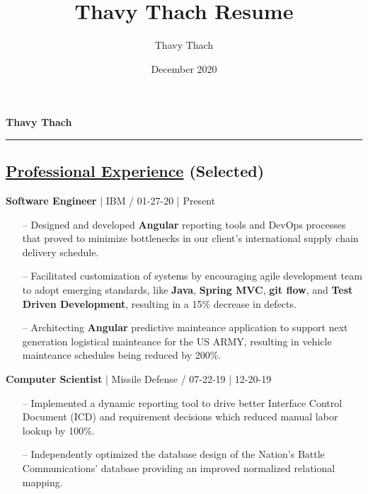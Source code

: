 \documentclass{article}
\title{Thavy Thach Resume}
\author{Thavy Thach}
\date{December 2020}
\begin{document}
\textbf{{\huge Thavy Thach}}
\newline
\noindent\rule{19cm}{0.1pt}

\begin{multicols}{2}

\section*{\underline{Professional Experience} {\small(Selected)}}

{\footnotesize{\textbf{Software Engineer} | IBM / 01-27-20 | Present}}
{\footnotesize{
\begin{itemize}
	\item[--] Designed and developed \textbf{Angular} reporting tools and DevOps processes that proved to minimize bottlenecks in our client's international supply chain delivery schedule.
	\item[--] Facilitated customization of systems by encouraging agile development team to adopt emerging standards, like \textbf{Java}, \textbf{Spring MVC}, \textbf{git flow}, and \textbf{Test Driven Development}, resulting in a 15\% decrease in defects.
	\item[--] Architecting \textbf{Angular} predictive mainteance application to support next generation logistical mainteance for the US ARMY, resulting in vehicle mainteance schedules being reduced by 200\%.  
\end{itemize}
}}
\hfill \break
{\footnotesize{\textbf{Computer Scientist} | Missile Defense / 07-22-19 | 12-20-19}}
{\footnotesize{
\begin{itemize}
	\item[--] Implemented a dynamic reporting tool to drive better Interface Control Document (ICD) and requirement decisions which reduced manual labor lookup by 100\%.
	\item[--] Independently optimized the database design of the Nation's Battle Communications' database providing an improved normalized relational mapping.
\end{itemize}
}}
\end{multicols}
\end{document}
